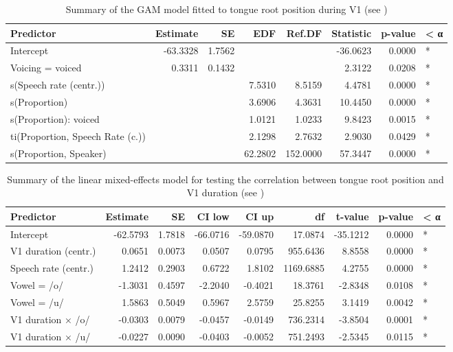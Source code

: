\documentclass[preprint]{JASAnew}
\begin{document}
\begin{table}

\caption{\label{tab:tra-gam-ar-table}Summary of the GAM model fitted to tongue root position during V1 (see )}
\centering
\fontsize{10}{12}\selectfont
\begin{tabular}[t]{lrrrrrrl}
\toprule
Predictor & Estimate & SE & EDF & Ref.DF & Statistic & p-value & < α\\
\midrule
Intercept & -63.3328 & 1.7562 &  &  & -36.0623 & 0.0000 & *\\
Voicing = voiced & 0.3311 & 0.1432 &  &  & 2.3122 & 0.0208 & *\\
s(Speech rate (centr.)) &  &  & 7.5310 & 8.5159 & 4.4781 & 0.0000 & *\\
s(Proportion) &  &  & 3.6906 & 4.3631 & 10.4450 & 0.0000 & *\\
s(Proportion): voiced &  &  & 1.0121 & 1.0233 & 9.8423 & 0.0015 & *\\
ti(Proportion, Speech Rate (c.)) &  &  & 2.1298 & 2.7632 & 2.9030 & 0.0429 & *\\
s(Proportion, Speaker) &  &  & 62.2802 & 152.0000 & 57.3447 & 0.0000 & *\\
\bottomrule
\end{tabular}
\end{table}

\begin{table}

\caption{\label{tab:tra-lm-2-table}Summary of the linear mixed-effects model for testing the correlation between tongue root position and V1 duration  (see )}
\centering
\fontsize{10}{12}\selectfont
\begin{tabular}[t]{lrrrrrrrl}
\toprule
Predictor & Estimate & SE & CI low & CI up & df & t-value & p-value & < α\\
\midrule
Intercept & -62.5793 & 1.7818 & -66.0716 & -59.0870 & 17.0874 & -35.1212 & 0.0000 & *\\
V1 duration (centr.) & 0.0651 & 0.0073 & 0.0507 & 0.0795 & 955.6436 & 8.8558 & 0.0000 & *\\
Speech rate (centr.) & 1.2412 & 0.2903 & 0.6722 & 1.8102 & 1169.6885 & 4.2755 & 0.0000 & *\\
Vowel = /o/ & -1.3031 & 0.4597 & -2.2040 & -0.4021 & 18.3761 & -2.8348 & 0.0108 & *\\
Vowel = /u/ & 1.5863 & 0.5049 & 0.5967 & 2.5759 & 25.8255 & 3.1419 & 0.0042 & *\\
V1 duration × /o/ & -0.0303 & 0.0079 & -0.0457 & -0.0149 & 736.2314 & -3.8504 & 0.0001 & *\\
V1 duration × /u/ & -0.0227 & 0.0090 & -0.0403 & -0.0052 & 751.2493 & -2.5345 & 0.0115 & *\\
\bottomrule
\end{tabular}
\end{table}
\end{document}
